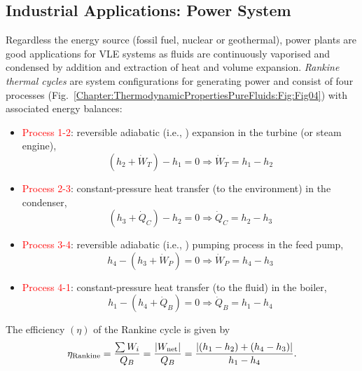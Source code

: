    \subsection{Industrial Applications: Power System}\label{Chapter:ThermodynamicPropertiesPureFluids:Section:PowerSystem}
Regardless the energy source (fossil fuel, nuclear or geothermal), power plants are good applications for VLE systems as fluids are continuously vaporised and condensed by addition and extraction of heat and volume expansion. {\it Rankine thermal cycles} are system configurations for generating power and consist of four processes (Fig.~\ref{Chapter:ThermodynamicPropertiesPureFluids:Fig:Fig04}) with associated energy balances:
     \begin{itemize}
      \item \textcolor{red}{Process 1-2}: reversible adiabatic (i.e., ) expansion in the turbine (or steam engine),
            \begin{displaymath}
               \left(h_{2} + \dot{W}_{T}\right)-h_{1} = 0 \Rightarrow \dot{W}_{T} = h_{1}-h_{2}
            \end{displaymath}
      \item \textcolor{red}{Process 2-3}: constant-pressure heat transfer (to the environment) in the condenser,
            \begin{displaymath}
               \left(h_{3} + \dot{Q}_{C}\right)-h_{2} = 0 \Rightarrow \dot{Q}_{C} = h_{2}-h_{3}
            \end{displaymath}
      \item \textcolor{red}{Process 3-4}: reversible adiabatic (i.e., ) pumping process in the feed pump,
            \begin{displaymath}
               h_{4} - \left(h_{3} + \dot{W}_{P}\right) = 0 \Rightarrow \dot{W}_{P} = h_{4}-h_{3}
            \end{displaymath}
      \item \textcolor{red}{Process 4-1}: constant-pressure heat transfer (to the fluid) in the boiler,
            \begin{displaymath}
               h_{1} - \left(h_{4} + \dot{Q}_{B}\right) = 0 \Rightarrow \dot{Q}_{B} = h_{1}-h_{4}
            \end{displaymath} 
     \end{itemize}
     The efficiency $\left(\eta\right)$ of the Rankine cycle is given by
           \begin{displaymath}
               \eta_{\text{Rankine}} = \displaystyle\frac{\sum W_{i}}{Q_{B}} = \displaystyle\frac{\left|W_{\text{net}}\right|}{Q_{B}} = \displaystyle\frac{\left|\left(h_{1}-h_{2}\right)+\left(h_{4}-h_{3}\right)\right|}{h_{1}-h_{4}}.
           \end{displaymath}
